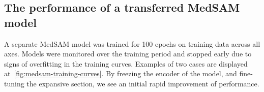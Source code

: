 \documentclass[11pt,twoside]{report}
\begin{document}
\begin{table}[h!]
  \centering
  \caption{Duplicate table from the Appendix Figure~\ref{tab:medsam-hd}: Haussdorf Distance across each anatomy. In bold are the anatomies where the MedSAM model has performed better than the baseline.}
  \label{tab:medsam-hd-duplicate}
\end{table}

\subsection{The performance of a transferred MedSAM model}\label{sec:medsam-transfer-performance}

A separate MedSAM model was trained for 100 epochs on training data across all axes. Models were monitored over the training period and stopped early due to signs of overfitting in the training curves. Examples of two cases are displayed at~\ref{fig:medsam-training-curves}. By freezing the encoder of the model, and fine-tuning the expansive section, we see an initial rapid improvement of performance.
\end{document}
